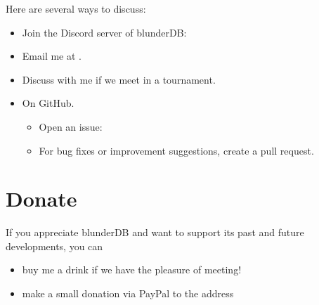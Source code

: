 \documentclass[letterpaper,10pt,english]{sphinxmanual}
\begin{document}
\sphinxAtStartPar
Here are several ways to discuss:
\begin{itemize}
\item {} 
\sphinxAtStartPar
Join the Discord server of blunderDB: 

\item {} 
\sphinxAtStartPar
Email me at .

\item {} 
\sphinxAtStartPar
Discuss with me if we meet in a tournament.

\item {} 
\sphinxAtStartPar
On GitHub.
\begin{itemize}
\item {} 
\sphinxAtStartPar
Open an issue: 

\item {} 
\sphinxAtStartPar
For bug fixes or improvement suggestions, create a pull request.

\end{itemize}

\end{itemize}


\chapter{Donate}
\label{\detokenize{index:faire-un-don}}
\sphinxAtStartPar
If you appreciate blunderDB and want to support its past and future developments, you can
\begin{itemize}
\item {} 
\sphinxAtStartPar
buy me a drink if we have the pleasure of meeting!

\item {} 
\sphinxAtStartPar
make a small donation via PayPal to the address 

\end{itemize}
\end{document}
